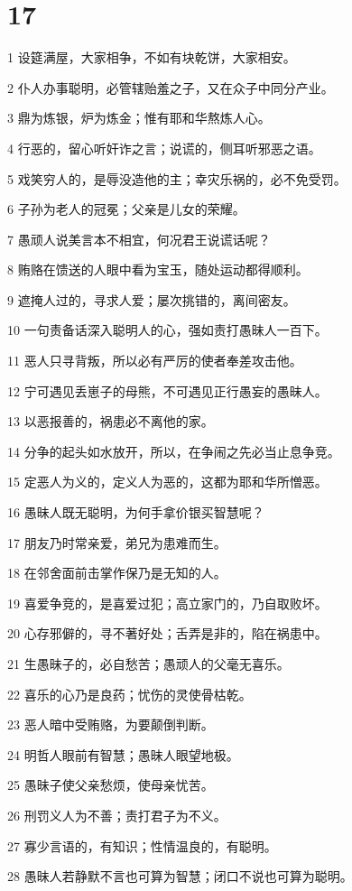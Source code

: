 \chapter{17}

\par 1 设筵满屋，大家相争，不如有块乾饼，大家相安。
\par 2 仆人办事聪明，必管辖贻羞之子，又在众子中同分产业。
\par 3 鼎为炼银，炉为炼金；惟有耶和华熬炼人心。
\par 4 行恶的，留心听奸诈之言；说谎的，侧耳听邪恶之语。
\par 5 戏笑穷人的，是辱没造他的主；幸灾乐祸的，必不免受罚。
\par 6 子孙为老人的冠冕；父亲是儿女的荣耀。
\par 7 愚顽人说美言本不相宜，何况君王说谎话呢？
\par 8 贿赂在馈送的人眼中看为宝玉，随处运动都得顺利。
\par 9 遮掩人过的，寻求人爱；屡次挑错的，离间密友。
\par 10 一句责备话深入聪明人的心，强如责打愚昧人一百下。
\par 11 恶人只寻背叛，所以必有严厉的使者奉差攻击他。
\par 12 宁可遇见丢崽子的母熊，不可遇见正行愚妄的愚昧人。
\par 13 以恶报善的，祸患必不离他的家。
\par 14 分争的起头如水放开，所以，在争闹之先必当止息争竞。
\par 15 定恶人为义的，定义人为恶的，这都为耶和华所憎恶。
\par 16 愚昧人既无聪明，为何手拿价银买智慧呢？
\par 17 朋友乃时常亲爱，弟兄为患难而生。
\par 18 在邻舍面前击掌作保乃是无知的人。
\par 19 喜爱争竞的，是喜爱过犯；高立家门的，乃自取败坏。
\par 20 心存邪僻的，寻不著好处；舌弄是非的，陷在祸患中。
\par 21 生愚昧子的，必自愁苦；愚顽人的父毫无喜乐。
\par 22 喜乐的心乃是良药；忧伤的灵使骨枯乾。
\par 23 恶人暗中受贿赂，为要颠倒判断。
\par 24 明哲人眼前有智慧；愚昧人眼望地极。
\par 25 愚昧子使父亲愁烦，使母亲忧苦。
\par 26 刑罚义人为不善；责打君子为不义。
\par 27 寡少言语的，有知识；性情温良的，有聪明。
\par 28 愚昧人若静默不言也可算为智慧；闭口不说也可算为聪明。

